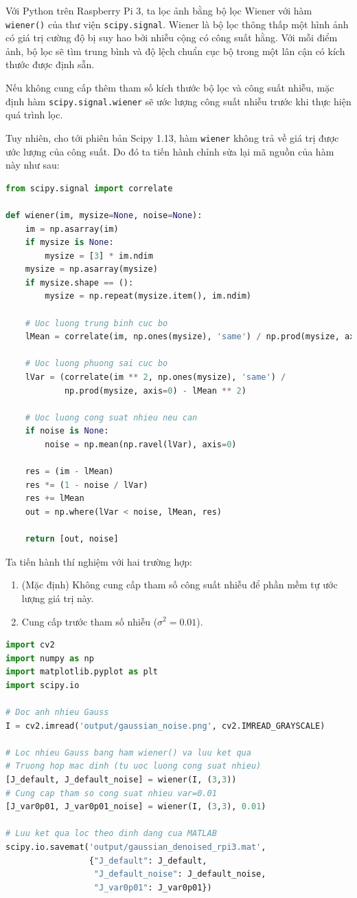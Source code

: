 Với Python trên Raspberry Pi 3, ta lọc ảnh bằng bộ lọc Wiener với hàm \texttt{wiener()} của thư viện \texttt{scipy.signal}. 
Wiener là bộ lọc thông thấp một hình ảnh có giá trị cường độ bị suy hao bởi nhiễu cộng có công suất hằng. 
Với mỗi điểm ảnh, bộ lọc sẽ tìm trung bình và độ lệch chuẩn cục bộ trong một lân cận có kích thước được định sẵn.

Nếu không cung cấp thêm tham số kích thước bộ lọc và công suất nhiễu,
mặc định hàm \texttt{scipy.signal.wiener} sẽ ước lượng công suất nhiễu trước khi thực hiện quá trình lọc.

Tuy nhiên, cho tới phiên bản Scipy 1.13, hàm \texttt{wiener} không trả về giá trị được ước lượng của công suất.
Do đó ta tiến hành chỉnh sửa lại mã nguồn của hàm này như sau:

\begin{lstlisting}[language=Python]
from scipy.signal import correlate

def wiener(im, mysize=None, noise=None):
    im = np.asarray(im)
    if mysize is None:
        mysize = [3] * im.ndim
    mysize = np.asarray(mysize)
    if mysize.shape == ():
        mysize = np.repeat(mysize.item(), im.ndim)

    # Uoc luong trung binh cuc bo
    lMean = correlate(im, np.ones(mysize), 'same') / np.prod(mysize, axis=0)

    # Uoc luong phuong sai cuc bo
    lVar = (correlate(im ** 2, np.ones(mysize), 'same') /
            np.prod(mysize, axis=0) - lMean ** 2)

    # Uoc luong cong suat nhieu neu can
    if noise is None:
        noise = np.mean(np.ravel(lVar), axis=0)

    res = (im - lMean)
    res *= (1 - noise / lVar)
    res += lMean
    out = np.where(lVar < noise, lMean, res)

    return [out, noise]
\end{lstlisting}

Ta tiến hành thí nghiệm với hai trường hợp:
\begin{enumerate}
    \item (Mặc định) Không cung cấp tham số công suất nhiễu để phần mềm tự ước lượng giá trị này.
    \item Cung cấp trước tham số nhiễu ($\sigma^2 = 0.01$).
\end{enumerate}

\begin{lstlisting}[language=Python]
import cv2
import numpy as np
import matplotlib.pyplot as plt
import scipy.io

# Doc anh nhieu Gauss
I = cv2.imread('output/gaussian_noise.png', cv2.IMREAD_GRAYSCALE)

# Loc nhieu Gauss bang ham wiener() va luu ket qua
# Truong hop mac dinh (tu uoc luong cong suat nhieu)
[J_default, J_default_noise] = wiener(I, (3,3))
# Cung cap tham so cong suat nhieu var=0.01
[J_var0p01, J_var0p01_noise] = wiener(I, (3,3), 0.01)

# Luu ket qua loc theo dinh dang cua MATLAB
scipy.io.savemat('output/gaussian_denoised_rpi3.mat', 
                 {"J_default": J_default, 
                  "J_default_noise": J_default_noise,
                  "J_var0p01": J_var0p01})
\end{lstlisting}

